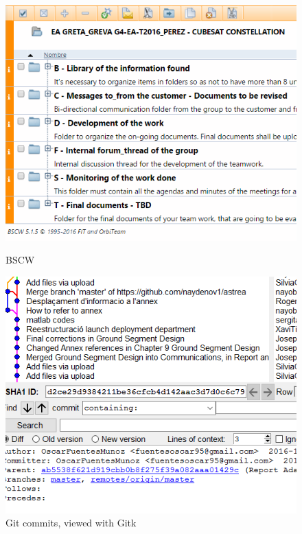 \begin{figure}[!htb]
  \includegraphics[width=\linewidth]{bscw.png}
  \caption{BSCW}\label{fig:bscw}
\endminipage\hfill
{}
  \includegraphics[width=\linewidth]{git.png}
  \caption{Git commits, viewed with Gitk}\label{fig:git}
\endminipage
\end{figure}

